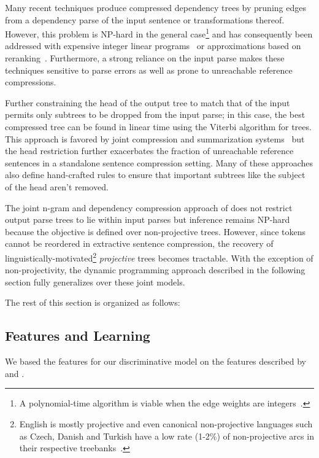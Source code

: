 \documentclass[11pt,a4paper]{article}
\begin{document}
Many recent techniques produce compressed dependency trees by
pruning edges from a dependency parse of the input
sentence or transformations thereof. However, this problem is NP-hard
in the general
case\footnote{A polynomial-time algorithm is viable when the edge weights
    are integers~\cite{lau06}.}
and has consequently been addressed with expensive integer linear
programs~\cite{filippova08a,filippova13} or approximations based on
reranking~\cite{nomoto09,galanis10}. Furthermore, a strong reliance
on the input parse makes these techniques sensitive to parse errors
as well as prone to unreachable reference compressions.

Further constraining the head of the output tree to match that of the
input permits only subtrees to be dropped from the input parse; in this case,
the best compressed tree can be found in linear time using the Viterbi
algorithm for trees. This approach is favored by joint compression
and summarization
systems~\cite{martins09a,gillick09,bergkirkpatrick11,almeida13,qian13}
but the head restriction further exacerbates the fraction of unreachable
reference sentences in a standalone sentence compression setting.
Many of these approaches also define hand-crafted rules
to ensure that important subtrees like the subject of the head aren't
removed.

The joint n-gram and dependency compression approach of
 does not restrict output parse trees to lie
within input parses but inference remains NP-hard~\cite{thadani14}
because the objective is defined over non-projective trees.
However, since tokens cannot be reordered in extractive sentence
compression, the recovery of linguistically-motivated\footnote{English
    is mostly projective and even
    canonical non-projective languages such
    as Czech, Danish and Turkish have a low rate (1-2\%) of
    non-projective arcs in their respective treebanks~\cite{nivre05}.}
\emph{projective} trees becomes tractable. With the exception of
non-projectivity, the dynamic programming approach described in
the following section fully generalizes over these joint models.

The rest of this section is organized as follows:


\subsection{Features and Learning}
\label{features}

We based the features for our discriminative model on the features
described by  and .
\end{document}

